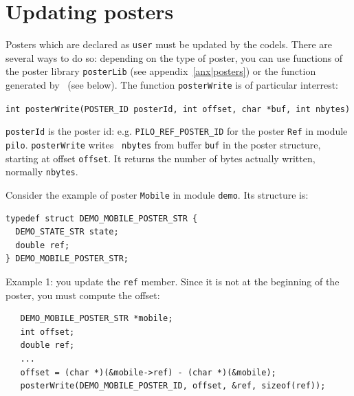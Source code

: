 \section{Updating posters}

Posters which are  declared as {\tt user}  must be updated by the codels.
There are several ways to do so: depending on the type of poster, you can
use  functions of    the      poster  library {\tt   posterLib}      (see
appendix~\ref{anx|posters}) or   the function  generated by \GenoM\  (see
below).  The function {\tt posterWrite} is of particular interrest:

\bigbreak
{\tt int posterWrite(POSTER\_ID posterId, int offset, char *buf, int nbytes)}
\bigbreak

{\tt posterId} is the poster id: e.g. {\tt PILO\_REF\_POSTER\_ID} for the
poster {\tt Ref} in  module {\tt  pilo}.   {\tt posterWrite} writes  {\tt
nbytes} from buffer {\tt buf} in the poster structure, starting at offset
{\tt offset}.  It returns the  number of bytes actually written, normally
{\tt nbytes}.

\bigbreak

Consider the example  of poster {\tt   Mobile} in module {\tt  demo}. Its
structure is:

\begin{center}\begin{cartouche}\small\begin{verbatim}
typedef struct DEMO_MOBILE_POSTER_STR {
  DEMO_STATE_STR state;
  double ref;
} DEMO_MOBILE_POSTER_STR;
\end{verbatim}\end{cartouche}\end{center}
\label{typedef|demomobile}

Example 1: you update the {\tt ref} member. Since it is not at the
beginning of the poster, you must compute the offset:

\begin{center}\begin{cartouche}\small\begin{verbatim}
   DEMO_MOBILE_POSTER_STR *mobile;
   int offset;
   double ref;
   ...
   offset = (char *)(&mobile->ref) - (char *)(&mobile);
   posterWrite(DEMO_MOBILE_POSTER_ID, offset, &ref, sizeof(ref));
\end{verbatim}\end{cartouche}\end{center}


